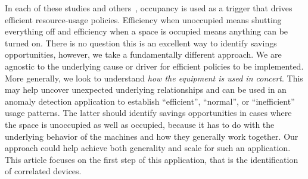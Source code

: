 
In each of these studies and others~\cite{AgarwalBDGW11, kaminthermo, buildanomaly}, occupancy is used as a trigger
that drives efficient resource-usage policies.  Efficiency
when unoccupied means shutting everything off and efficiency when a space is occupied means anything
can be turned on.  There is no question this is an excellent way to identify savings opportunities, however, we
take a fundamentally different approach.  We are agnostic to the underlying cause or driver for efficient
policies to be implemented.  More generally, we look to understand \emph{how the equipment is used in
concert}.  This may help uncover unexpected underlying relationships and can be used in an anomaly detection application
to establish ``efficient'', ``normal'', or ``inefficient'' usage patterns.  The latter 
should identify savings opportunities in cases where the space is unoccupied as well 
as occupied, because it has to do with the underlying behavior of the machines and how they generally work
together.  Our approach could help achieve both generality and scale for such an application.
This article focuses on the first step of this application, that is the identification of correlated devices.



